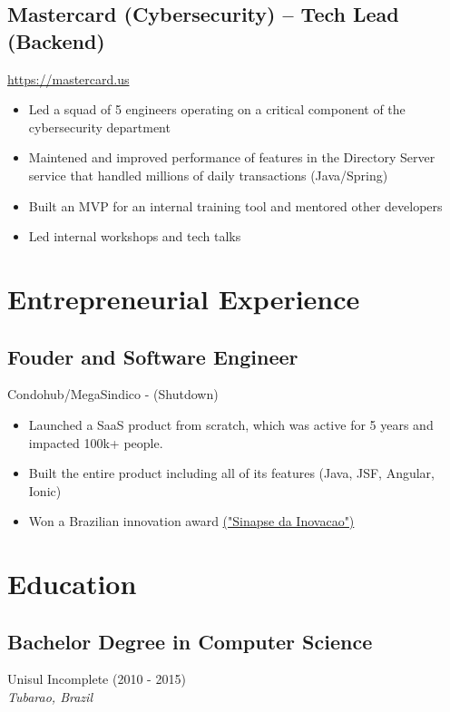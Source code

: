 \documentclass[11pt, a4paper]{article}
\begin{document}
\subsection*{Mastercard (Cybersecurity) -- Tech Lead (Backend)}
\href{https://www.mastercard.us/en-us.html}{https://mastercard.us}
\begin{itemize}[noitemsep]
    \item Led a squad of 5 engineers operating on a critical component of the cybersecurity department
    \item Maintened and improved performance of features in the Directory Server service that handled millions of daily transactions (Java/Spring)
    \item Built an MVP for an internal training tool and mentored other developers
    \item Led internal workshops and tech talks
\end{itemize}

\section*{Entrepreneurial Experience}
\subsection*{Fouder and Software Engineer}
Condohub/MegaSindico - (Shutdown)
\begin{itemize}[noitemsep]
    \item Launched a SaaS product from scratch, which was active for 5 years and impacted 100k+ people.
    \item Built the entire product including all of its features (Java, JSF, Angular, Ionic)
    \item Won a Brazilian innovation award \href{https://certi.org.br/pt/cases-sinapse-da-inovacao}{("Sinapse da Inovacao")}
\end{itemize}

\section*{Education}
\subsection*{Bachelor Degree in Computer Science}
Unisul \hfill Incomplete (2010 - 2015)\\
\textit{Tubarao, Brazil}
\end{document}
